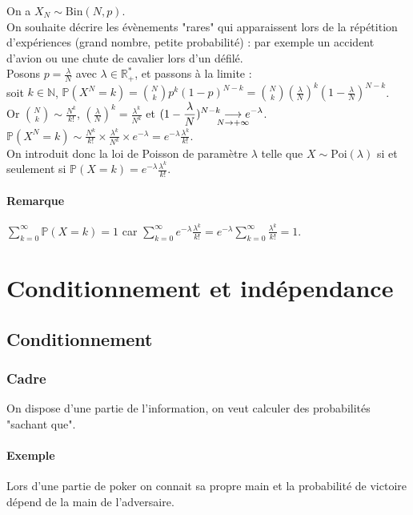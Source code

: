 \documentclass[a4paper,10pt]{book} %
\newcommand{\Rpe}{\mathbb{R}_{+}^{*}}
\newcommand{\N}{\mathbb{N}}
\renewcommand{\P}{\mathbb{P}} %
\newcommand{\lime}[4]{#1\underset{\mathclap{#2 \rightarrow #3}}{\longrightarrow} #4}
\newcommand{\Bin}{\mathrm{Bin}} %
\newcommand{\Poi}{\mathrm{Poi}} %
\begin{document}
On a $X_N\sim \Bin(N,p)$.\\

On souhaite décrire les évènements "rares" qui apparaissent lors de la répétition d'expériences (grand nombre, petite probabilité) : par exemple un accident d'avion ou une chute de cavalier lors d'un défilé.\\

Posons $p=\frac{\lambda}{N}$ avec $\lambda\in \Rpe$, et passons à la limite :\\
soit $k\in \N$, $\displaystyle \P(X^N=k)=\binom{N}{k}p^k(1-p)^{N-k}=\binom{N}{k}(\frac{\lambda}{N})^k(1-\frac{\lambda}{N})^{N-k}$.\\

Or $\displaystyle \binom{N}{k}\sim \frac{N^k}{k!}$, $\displaystyle (\frac{\lambda}{N})^k=\frac{\lambda^k}{N^k}$ et $\displaystyle \lime{(1-\frac{\lambda}{N})^{N-k}}{N}{+\infty}{e^{-\lambda}}$.\\

$\displaystyle \P(X^N=k)\sim\frac{N^k}{k!}\times \frac{\lambda^k}{N^k}\times e^{-\lambda}=e^{-\lambda}\frac{\lambda^k}{k!}$.\\

On introduit donc la loi de Poisson de paramètre $\lambda$ telle que $X\sim \Poi(\lambda)$ si et seulement si $\displaystyle \P(X=k)=e^{-\lambda}\frac{\lambda^k}{k!}$.

\subsubsection{Remarque}
$\displaystyle \sum_{k=0}^\infty \P(X=k)=1$ car $\displaystyle \sum_{k=0}^\infty e^{-\lambda}\frac{\lambda^k}{k!}=e^{-\lambda}\sum_{k=0}^\infty \frac{\lambda^k}{k!}=1$.

\chapter{Conditionnement et indépendance}
\section{Conditionnement}
\subsection{Cadre}
On dispose d'une partie de l'information, on veut calculer des probabilités "sachant que".

\subsubsection{Exemple}
Lors d'une partie de poker on connait sa propre main et la probabilité de victoire dépend de la main de l'adversaire.
\end{document}
